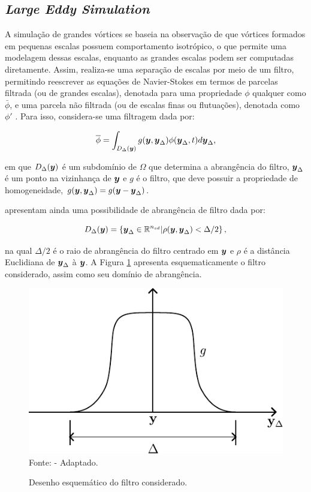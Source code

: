 \subsection{\textit{Large Eddy Simulation}} \label{LES}

A simulação de grandes vórtices se baseia na observação de que vórtices formados em pequenas escalas possuem comportamento isotrópico, o que permite uma modelagem dessas escalas, enquanto as grandes escalas podem ser computadas diretamente. Assim, realiza-se uma separação de escalas por meio de um filtro, permitindo reescrever as equações de Navier-Stokes em termos de parcelas filtrada (ou de grandes escalas), denotada para uma propriedade $\phi$ qualquer como $\bar{\phi}$, e uma parcela não filtrada (ou de escalas finas ou flutuações), denotada como $\phi'$ \cite{germano1991dynamic,hughes2000large,moeng2015large}. Para isso, considera-se uma filtragem dada por:

\begin{equation}
    \overline{\phi}=\int_{D_\Delta(\boldsymbol{y})}{g(\boldsymbol{y},\boldsymbol{y}_\Delta)\phi(\boldsymbol{y}_\Delta,t)d\boldsymbol{y}_\Delta}\text{,}
\end{equation}

\noindent em que $D_\Delta(\boldsymbol{y})$ é um subdomínio de $\Omega$ que determina a abrangência do filtro, $\boldsymbol{y}_\Delta$ é um ponto na vizinhança de $\boldsymbol{y}$ e $g$ é o filtro, que deve possuir a propriedade de homogeneidade, $g(\boldsymbol{y},\boldsymbol{y}_\Delta)=g(\boldsymbol{y}-\boldsymbol{y}_\Delta)$.

 apresentam ainda uma possibilidade de abrangência de filtro dada por:

\begin{equation}
    D_\Delta(\boldsymbol{y})=\left\{\boldsymbol{y}_\Delta\in\mathbb{R}^{n_{sd}}|\rho(\boldsymbol{y},\boldsymbol{y}_\Delta)<\Delta/2\right\}\text{,}
\end{equation}

\noindent na qual $\Delta/2$ é o raio de abrangência do filtro centrado em $\boldsymbol{y}$ e $\rho$ é a distância Euclidiana de $\boldsymbol{y}_\Delta$ à $\boldsymbol{y}$. A Figura \ref{fig:Filtro} apresenta esquematicamente o filtro considerado, assim como seu domínio de abrangência.

\begin{figure}[h!]
    \centering
    \caption{Desenho esquemático do filtro considerado.}
    \includegraphics[width=0.5\linewidth]{Figuras/filtro.pdf}
    \\Fonte:  - Adaptado.
    \label{fig:Filtro}
\end{figure}

